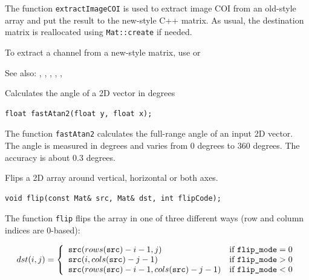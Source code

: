 The function \texttt{extractImageCOI} is used to extract image COI from an old-style array and put the result to the new-style C++ matrix. As usual, the destination matrix is reallocated using \texttt{Mat::create} if needed.

To extract a channel from a new-style matrix, use  or 

See also: , , , , , 


\label{fastAtan2}
Calculates the angle of a 2D vector in degrees

\begin{lstlisting}
float fastAtan2(float y, float x);
\end{lstlisting}
\begin{description}
\end{description}

The function \texttt{fastAtan2} calculates the full-range angle of an input 2D vector. The angle is 
measured in degrees and varies from 0 degrees to 360 degrees. The accuracy is about 0.3 degrees.

\label{flip}
Flips a 2D array around vertical, horizontal or both axes.

\begin{lstlisting}
void flip(const Mat& src, Mat& dst, int flipCode);
\end{lstlisting}
\begin{description}
\end{description}

The function \texttt{flip} flips the array in one of three different ways (row and column indices are 0-based):

\[
dst(i,j) = \left\{ \begin{array}{l l} \texttt{src}(rows(\texttt{src})-i-1,j) & \mbox{if $\texttt{flip\_mode} = 0$}\\ \texttt{src}(i,cols(\texttt{src})-j-1) & \mbox{if $\texttt{flip\_mode} > 0$}\\ \texttt{src}(rows(\texttt{src})-i-1,cols(\texttt{src})-j-1) & \mbox{if $\texttt{flip\_mode} < 0$}\\ \end{array} \right.
\]

